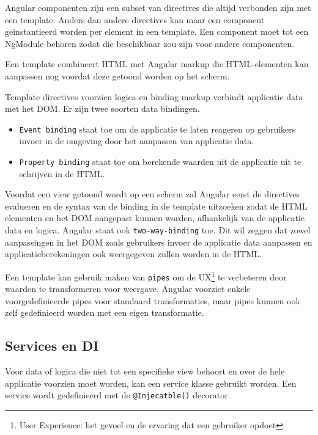Angular componenten zijn een subset van directives die altijd verbonden zijn met een template. Anders dan andere directives kan maar een component geïnstantieerd worden per element in een template. Een component moet tot een NgModule behoren zodat die beschikbaar zou zijn voor andere componenten. \autocite{Angular2019a}

Een template combineert HTML met Angular markup die HTML-elementen kan aanpassen nog voordat deze getoond worden op het scherm. \autocite{Angular2019a}

Template directives voorzien logica en binding markup verbindt applicatie data met het DOM. Er zijn twee soorten data bindingen. \autocite{Angular2019a}
\begin{itemize}
	\item \texttt{Event binding} staat toe om de applicatie te laten reageren op gebruikers invoer in de omgeving door het aanpassen van applicatie data.
	\item \texttt{Property binding} staat toe om berekende waarden uit de applicatie uit te schrijven in de HTML.
\end{itemize}
Voordat een view getoond wordt op een scherm zal Angular eerst de directives evalueren en de syntax van de binding in de template uitzoeken zodat de HTML elementen en het DOM aangepast kunnen worden, afhankelijk van de applicatie data en logica. Angular staat ook \texttt{two-way-binding} toe. Dit wil zeggen dat zowel aanpassingen in het DOM zoals gebruikers invoer de applicatie data aanpassen en applicatieberekeningen ook weergegeven zullen worden in de HTML. \autocite{Angular2019a}

Een template kan gebruik maken van \texttt{pipes} om de UX\footnote{User Experience: het gevoel en de ervaring dat een gebruiker opdoet} te verbeteren door waarden te transformeren voor weergave. Angular voorziet enkele voorgedefinieerde pipes voor standaard transformaties, maar pipes kunnen ook zelf gedefinieerd worden met een eigen transformatie. \autocite{Angular2019a}

\subsection{Services en DI}

Voor data of logica die niet tot een specifieke view behoort en over de hele applicatie voorzien moet worden, kan een service klasse gebruikt worden. Een service wordt gedefinieerd met de \texttt{@Injecatble()} decorator. \autocite{Angular2019a}


